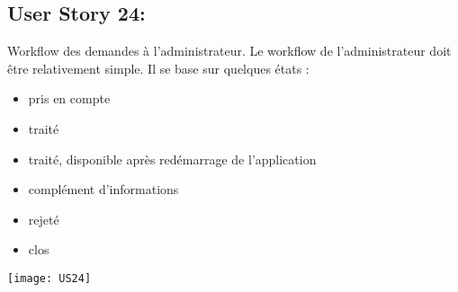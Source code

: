 \newpage{}
\subsection{User Story 24:}
Workflow des demandes à l'administrateur. Le workflow de l'administrateur doit être relativement
simple. Il se base sur quelques états :

\begin{itemize}
  \item pris en compte
  \item traité
  \item traité, disponible après redémarrage de l'application
  \item complément d'informations
  \item rejeté
  \item clos
\end{itemize}


  \begin{center}
        \texttt{[image: US24]}
  \end{center}